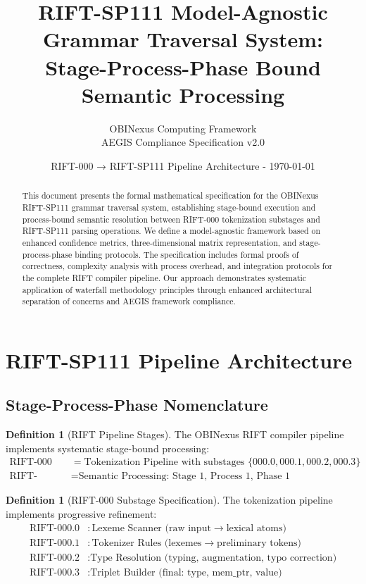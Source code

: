 \documentclass[11pt,a4paper]{article}
\title{RIFT-SP111 Model-Agnostic Grammar Traversal System:\\
Stage-Process-Phase Bound Semantic Processing}
\author{OBINexus Computing Framework\\
AEGIS Compliance Specification v2.0}
\date{RIFT-000 → RIFT-SP111 Pipeline Architecture - \today}
\theoremstyle{definition}
\newtheorem{definition}[theorem]{Definition}
\theoremstyle{remark}
\begin{document}
\maketitle

\begin{abstract}
This document presents the formal mathematical specification for the OBINexus RIFT-SP111 grammar traversal system, establishing stage-bound execution and process-bound semantic resolution between RIFT-000 tokenization substages and RIFT-SP111 parsing operations. We define a model-agnostic framework based on enhanced confidence metrics, three-dimensional matrix representation, and stage-process-phase binding protocols. The specification includes formal proofs of correctness, complexity analysis with process overhead, and integration protocols for the complete RIFT compiler pipeline. Our approach demonstrates systematic application of waterfall methodology principles through enhanced architectural separation of concerns and AEGIS framework compliance.
\end{abstract}

\tableofcontents


\section{RIFT-SP111 Pipeline Architecture}
\label{sec:architecture}

\subsection{Stage-Process-Phase Nomenclature}
\label{subsec:nomenclature}

\begin{definition}[RIFT Pipeline Stages]
The OBINexus RIFT compiler pipeline implements systematic stage-bound processing:
\begin{align}
\text{RIFT-000} &= \text{Tokenization Pipeline with substages } \{000.0, 000.1, 000.2, 000.3\} \\
\text{RIFT-SP111} &= \text{Semantic Processing: Stage 1, Process 1, Phase 1}
\end{align}
\end{definition}

\begin{definition}[RIFT-000 Substage Specification]
The tokenization pipeline implements progressive refinement:
\begin{align}
\text{RIFT-000.0} &: \text{Lexeme Scanner (raw input} \to \text{lexical atoms)} \\
\text{RIFT-000.1} &: \text{Tokenizer Rules (lexemes} \to \text{preliminary tokens)} \\
\text{RIFT-000.2} &: \text{Type Resolution (typing, augmentation, typo correction)} \\
\text{RIFT-000.3} &: \text{Triplet Builder (final: type, mem\_ptr, value)}
\end{align}
\end{definition}
\end{document}
